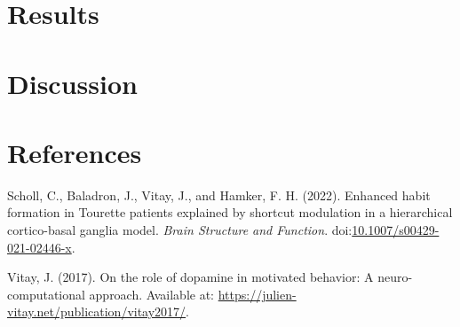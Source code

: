 \documentclass[
  11pt,
  a4paper,
]{scrbook}
\newlength{\cslhangindent}
\newenvironment{CSLReferences}[2] %
 {\begin{list}{}{%
  \setlength{\itemindent}{0pt}
  \setlength{\leftmargin}{0pt}
  \setlength{\parsep}{0pt}
  \ifodd #1
   \setlength{\leftmargin}{\cslhangindent}
   \setlength{\itemindent}{-1\cslhangindent}
  \fi
  \setlength{\itemsep}{#2\baselineskip}}}
 {\end{list}}
\begin{document}

\chapter{Results}\label{sec-results}


\chapter{Discussion}\label{sec-discussion}


\chapter*{References}\label{references}


\label{refs}
\begin{CSLReferences}{1}{1}
Scholl, C., Baladron, J., Vitay, J., and Hamker, F. H. (2022). Enhanced
habit formation in {Tourette} patients explained by shortcut modulation
in a hierarchical cortico-basal ganglia model. \emph{Brain Structure and
Function}.
doi:\href{https://doi.org/10.1007/s00429-021-02446-x}{10.1007/s00429-021-02446-x}.

Vitay, J. (2017). On the role of dopamine in motivated behavior: A
neuro-computational approach. Available at:
\url{https://julien-vitay.net/publication/vitay2017/}.

\end{CSLReferences}


\backmatter
\end{document}
